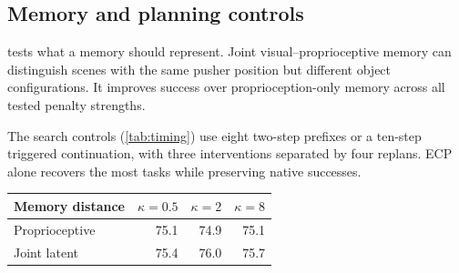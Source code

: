 \begin{table}[!t]
\begin{minipage}[t]{\columnwidth}
\subsection{Memory and planning controls}
 tests what a memory should represent. Joint visual--proprioceptive memory can distinguish scenes with the same pusher position but different object configurations. It improves success over proprioception-only memory across all tested penalty strengths.\par\smallskip
\normalsize
The search controls (\cref{tab:timing}) use eight two-step prefixes or a ten-step triggered continuation, with three interventions separated by four replans. ECP alone recovers the most tasks while preserving native successes.\par
\end{minipage}\hfill
\begin{minipage}[t]{\columnwidth}
\vspace{0pt}
\par\smallskip
{\centering
\centering
{}
\label{tab:memory-strength}
\small
\begin{tabular}{lrrr}
\toprule
Memory distance & $\kappa=0.5$ & $\kappa=2$ & $\kappa=8$\\
\midrule
Proprioceptive &75.1&74.9&75.1\\
Joint latent &75.4&76.0&75.7\\
\bottomrule
\end{tabular}
\par}
\end{minipage}\par
\par\smallskip
\noindent \begin{minipage}[t]{\columnwidth}
\vspace{0pt}

\end{minipage}
\end{table}
